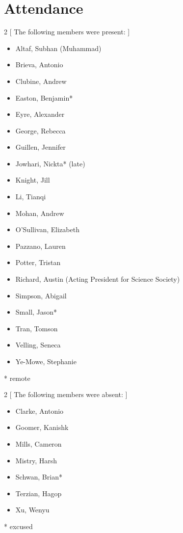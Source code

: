 \section*{Attendance}

\begin{multicols}{2}
    [
        The following members were present:
    ]
\begin{itemize}

    \item Altaf, Subhan (Muhammad)
    \item Brieva, Antonio
    \item Clubine, Andrew
    \item Easton, Benjamin*
    \item Eyre, Alexander
    \item George, Rebecca
    \item Guillen, Jennifer
    \item Jowhari, Nickta*  (late)
    \item Knight, Jill
    \item Li, Tianqi
    \item Mohan, Andrew
    \item O'Sullivan, Elizabeth
    \item Pazzano, Lauren 
    \item Potter, Tristan
    \item Richard, Austin  (Acting President for Science Society)
    \item Simpson, Abigail
    \item Small, Jason*
    \item Tran, Tomson
    \item Velling, Seneca
    \item Ye-Mowe, Stephanie

\end{itemize}

\end{multicols}
* remote \\

\begin{multicols}{2}
    [
        The following members were absent:
    ]
\begin{itemize}

    \item Clarke, Antonio
    \item Goomer, Kanishk
    \item Mills, Cameron
    \item Mistry, Harsh
    \item Schwan, Brian*
    \item Terzian, Hagop
    \item Xu, Wenyu

\end{itemize}
\end{multicols}
* excused\\



